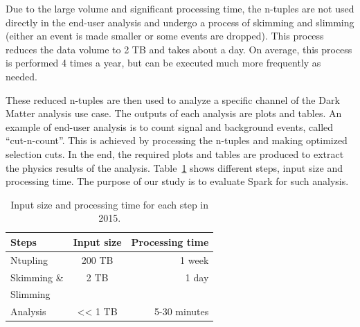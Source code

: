 \documentclass[11pt, twocolumn]{article}
\begin{document}
Due to the large volume and significant processing time, the n-tuples are not used directly in the end-user analysis and undergo a process of skimming and slimming 
(either an event is made smaller or some events are dropped). 
This process reduces the data volume to 2 TB and takes about a day. 
On average, this process is performed 4 times a year, but can be executed much more frequently as needed. 

These reduced n-tuples are then used to analyze a specific channel of 
the Dark Matter analysis use case. The outputs of each analysis are plots and tables. 
An example of end-user analysis is to count signal and background events, 
called ``cut-n-count''. This is achieved by processing the n-tuples 
and making optimized selection cuts. In the end, the required plots
 and tables are produced to extract the physics results of the analysis.
 Table~\ref{tab:1} shows different steps, input size and processing time. 
 The purpose of our study is to evaluate Spark for such analysis. 

\begin{table}[h]
\begin{tabular}{ l | c | r }
\hline
  Steps & Input size & Processing time \\
  \hline
  Ntupling & 200 TB & ~ 1 week \\
  \hline
  Skimming \&  &2 TB  & ~ 1 day\\
  Slimming & & \\
  \hline
  Analysis &  << 1 TB & 5-30 minutes\\
  \hline
\end{tabular}
\caption{Input size and processing time for each step in 2015.}
  \label{tab:1}
  \end{table}

\end{document}
